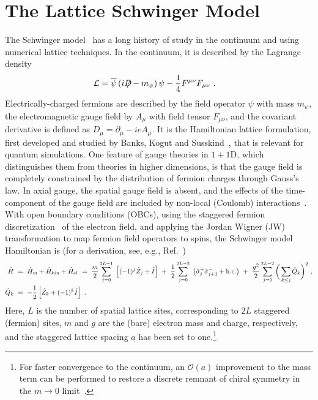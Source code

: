 \documentclass[aps, pra, onecolumn, tightenlines, letterpaper, amsmath, amssymb, preprintnumbers, floatfix, longbibliography, nofootinbib]{revtex4-2}
\def\Dslash{{ D\hskip-0.6em /}}
\begin{document}
\section{The Lattice Schwinger Model}
\label{sec:SchwingerHam}
\noindent
The Schwinger model~\cite{Schwinger:1962tp} has a long history of study 
in the continuum and using numerical lattice techniques.
 In the continuum, it is described by the Lagrange density
 \begin{align}
 {\cal L}
 & =  \overline{\psi}\left( i \Dslash - m_\psi \right) \psi - \frac{1}{4} F^{\mu\nu} F_{\mu\nu}
 \ .
 \label{eq:LagSM}
 \end{align}
Electrically-charged fermions are described by the field operator $\psi$ with mass $m_\psi$,
the electromagnetic gauge field by $A_\mu$ with field tensor $F_{\mu\nu}$, 
and the covariant derivative is defined as $D_\mu = \partial_\mu - i e A_\mu$.
It is the Hamiltonian lattice formulation,
first developed and studied by Banks, Kogut and Susskind~\cite{Kogut:1974ag,Banks:1975gq},
that is relevant for quantum simulations. 
One feature of gauge theories in $1+1$D, which distinguishes 
them from theories in higher dimensions,
is that the gauge field is completely constrained 
by the distribution of fermion charges through Gauss's law.
In axial gauge, the spatial gauge field is absent, and the effects of the time-component of the gauge field
are included by non-local (Coulomb) interactions~\cite{Sala:2018dui,Farrell:2022wyt}.
With  open boundary conditions (OBCs),  
using the staggered fermion discretization~\cite{Kogut:1974ag} of the electron field,
and applying the Jordan Wigner (JW) transformation to map fermion field operators to spins, 
the Schwinger model Hamiltonian is (for a derivation, see, e.g., Ref.~\cite{Kokail:2018eiw})
%
\begin{align}
\hat H & \ =\  \hat H_m + \hat H_{kin} + \hat H_{el} \ = \ \frac{m}{ 2}\sum_{j=0}^{2L-1}\ \left[ (-1)^j \hat Z_j + \hat{I} \right] \ + \ \frac{1}{2}\sum_{j=0}^{2L-2}\ \left( \hat \sigma^+_j \hat\sigma^-_{j+1} + {\rm h.c.} \right) \ + \ \frac{g^2}{ 2}\sum_{j=0}^{2L-2}\bigg (\sum_{k\leq j} \hat Q_k \bigg )^2 
\ ,
\nonumber \\ 
\hat Q_k & \ = \ -\frac{1}{2}\left[ \hat Z_k + (-1)^k\hat{I} \right] \ .
\label{eq:Hgf}
\end{align}
%
Here, $L$ is the number of  spatial lattice sites, 
corresponding to $2L$ staggered (fermion) sites, $m$ and $g$ are the (bare) electron mass and charge, respectively, and the staggered lattice spacing $a$ has been set to one.\footnote{For faster convergence to the continuum, an ${\mathcal O}(a)$ improvement to the mass term can be performed to restore a discrete remnant of chiral symmetry in the $m\to0$ limit~\cite{Dempsey:2022nys}.} 
\end{document}
